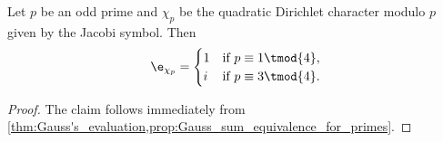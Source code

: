 \documentclass[12pt]{article}
\begin{document}
      \begin{corollary}
        Let \(p\) be an odd prime and \(\chi_{p}\) be the quadratic Dirichlet character modulo \(p\) given by the Jacobi symbol. Then
        \[
          \e_{\chi_{p}} = \begin{cases} 1 & \text{if \(p \equiv 1 \tmod{4}\)}, \\ i & \text{if \(p \equiv 3 \tmod{4}\)}. \end{cases}
        \]
      \end{corollary}
      \begin{proof}
        The claim follows immediately from \cref{thm:Gauss's_evaluation,prop:Gauss_sum_equivalence_for_primes}.
      \end{proof}
  
\end{document}
